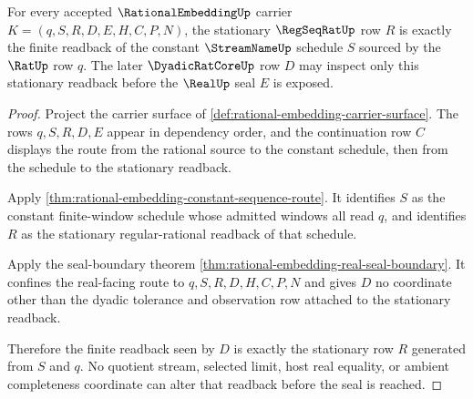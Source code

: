 \begin{theorem}
\label{thm:rational-embedding-stationary-readback-exactness}
For every accepted $\RationalEmbeddingUp$ carrier $K=(q,S,R,D,E,H,C,P,N)$, the stationary $\RegSeqRatUp$ row $R$ is exactly the finite readback of the constant $\StreamNameUp$ schedule $S$ sourced by the $\RatUp$ row $q$. The later $\DyadicRatCoreUp$ row $D$ may inspect only this stationary readback before the $\RealUp$ seal $E$ is exposed.
\end{theorem}
\begin{proof}
Project the carrier surface of \autoref{def:rational-embedding-carrier-surface}. The rows $q,S,R,D,E$ appear in dependency order, and the continuation row $C$ displays the route from the rational source to the constant schedule, then from the schedule to the stationary readback.

Apply \autoref{thm:rational-embedding-constant-sequence-route}. It identifies $S$ as the constant finite-window schedule whose admitted windows all read $q$, and identifies $R$ as the stationary regular-rational readback of that schedule.

Apply the seal-boundary theorem \autoref{thm:rational-embedding-real-seal-boundary}. It confines the real-facing route to $q,S,R,D,H,C,P,N$ and gives $D$ no coordinate other than the dyadic tolerance and observation row attached to the stationary readback.

Therefore the finite readback seen by $D$ is exactly the stationary row $R$ generated from $S$ and $q$. No quotient stream, selected limit, host real equality, or ambient completeness coordinate can alter that readback before the seal is reached.
\end{proof}

